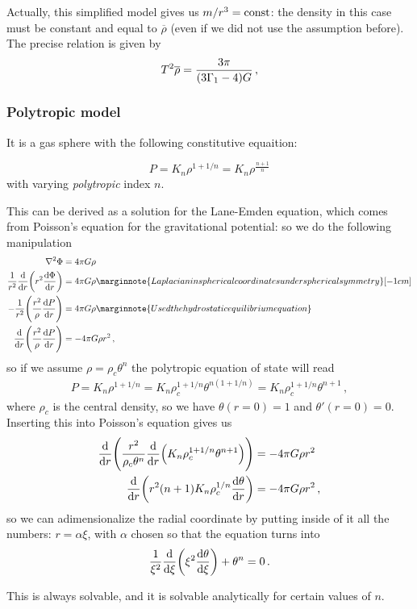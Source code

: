 \documentclass[main.tex]{subfiles}
\begin{document}
Actually, this simplified model gives us \(m / r^3 = \text{const}\): the density in this case must be constant and equal to \(\overline{\rho}\) (even if we did not use the assumption before). 
The precise relation is given by 
%
\begin{align}
T^2 \overline{\rho} = \frac{3 \pi }{\qty(3 \Gamma_1 -4) G}
\,,
\end{align}
%


\subsubsection{Polytropic model}

It is a gas sphere with the following constitutive equaition:

\begin{equation}
  P = K_n \rho^{1 + 1/n} = K_n \rho^{\frac{n+1}{n}}
\end{equation}
%
with varying \emph{polytropic} index \(n\).

\begin{bluebox}
This can be derived as a solution for the Lane-Emden equation, which comes from Poisson's equation for the gravitational potential: so we do the following manipulation 
%
\begin{align}
\nabla^2 \Phi  &= 4 \pi G \rho  \\
\frac{1}{r^2} \dv{}{r} \qty(r^2 \dv{\Phi }{r}) &= 4 \pi G \rho  \marginnote{Laplacian in spherical coordinates under spherical symmetry}[-1cm]\\
-\frac{1}{r^2}\qty(\frac{r^2}{\rho } \dv{P}{r}) &= 4 \pi G \rho   \marginnote{Used the hydrostatic equilibrium equation}\\
\dv{}{r} \qty(\frac{r^2}{\rho } \dv{P}{r}) &= - 4 \pi G \rho r^2
\,,
\end{align}
%
so if we assume \(\rho = \rho_{c} \theta^{n}\) the polytropic equation of state will read 
%
\begin{align}
P = K_n \rho^{1 + 1/n} = K_n \rho_{c}^{1 + 1/n} \theta^{n (1 + 1/n)}
= K_n \rho_{c}^{1 + 1/n} \theta^{n+1}
\,,
\end{align}
%
where \(\rho_{c}\) is the central density, so we have \(\theta (r=0) = 1\) and \(\theta' (r=0) =0\). Inserting this into Poisson's equation gives us 
%
\begin{align}
\dv{}{r} \qty(\frac{r^2}{\rho_{c} \theta^{n}}
\dv{}{r} \qty(K_{n} \rho_{c}^{1 + 1/n} \theta^{n+1})) &=-4 \pi G \rho r^2  \\
\dv{}{r} \qty(r^2 (n+1) K_n \rho_{c}^{1/n} \dv{\theta }{r}) & = - 4 \pi G \rho r^2
\,,
\end{align}
%
so we can adimensionalize the radial coordinate by putting inside of it all the numbers: \(r = \alpha \xi \), with \(\alpha \) chosen so that the equation turns into
%
\begin{align}
\frac{1}{\xi^2} \dv{}{\xi } \qty(\xi^2 \dv{\theta }{\xi })
+ \theta^{n} = 0
\,.
\end{align}

This is always solvable, and it is solvable analytically for certain values of \(n\). 

\end{bluebox}
\end{document}
